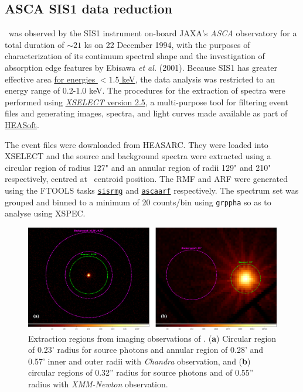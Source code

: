     \subsection{ASCA SIS1 data reduction}
    	\source\ was observed by the SIS1 instrument on-board JAXA's \textit{ASCA} observatory for a total duration of $\sim 21$ ks on 22 December 1994, with the purposes of characterization of its continuum spectral shape and the investigation of absorption edge features by Ebisawa \textit{et al.} (2001). %
    	Because SIS1 has greater effective area %
    	\href{https://heasarc.gsfc.nasa.gov/docs/asca/newsletters/sis_overview.html}{for energies $<1.5$ keV}, the data analysis was restricted to an energy range of 0.2-1.0 keV. The procedures for the extraction of spectra were performed using %
    	\href{https://heasarc.gsfc.nasa.gov/ftools/xselect/}{\textit{XSELECT} version 2.5}, a multi-purpose tool for filtering event files and generating images, spectra, and light curves made available as part of \href{https://heasarc.gsfc.nasa.gov/docs/software/heasoft/}{HEASoft}.
    	
    	The event files were downloaded from HEASARC. They were loaded into XSELECT and the source and background spectra were extracted using a circular region of radius 127" and an annular region of radii 129" and 210" respectively, centred at \source\ centroid position. The RMF and ARF were generated using the FTOOLS tasks %
    	\href{https://heasarc.gsfc.nasa.gov/lheasoft/ftools/fhelp/sisrmg.html}{\texttt{sisrmg}} and %
    	\href{https://heasarc.gsfc.nasa.gov/lheasoft/ftools/fhelp/ascaarf.html}{\texttt{ascaarf}} respectively. The spectrum set was grouped and binned to a minimum of 20 counts/bin using \texttt{grppha} so as to analyse using XSPEC.
    	
    	\begin{figure}[!htb]
	        \centering
	        \includegraphics[width=\textwidth]{figures/rx-j0925-7-4758_src-bkg}
	        \caption{Extraction regions from imaging observations of \source. (\textbf{a}) Circular region of 0.23' radius for source photons and annular region of 0.28' and 0.57' inner and outer radii with \textit{Chandra} observation, and (\textbf{b}) circular regions of 0.32'' radius for source photons and of 0.55'' radius with \textit{XMM-Newton} observation.}
	        \label{fig:src-bkg}
	    \end{figure}
	    
